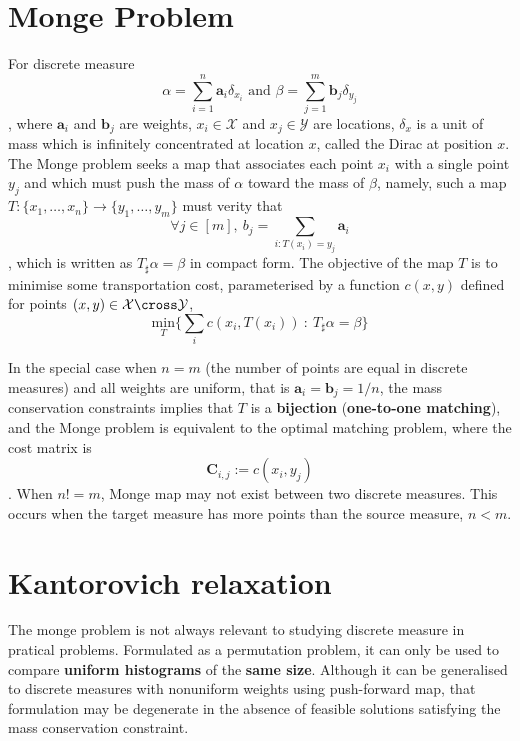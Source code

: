 \section{Monge Problem}
\begin{definition}\label{def}
  For discrete measure
  $$\alpha=\sum_{i=1}^n \mathbf{a}_i\delta_{x_i} \text{ and } \beta=\sum_{j=1}^m \mathbf{b}_j\delta_{y_j}$$,
  where $\mathbf{a}_i$ and $\mathbf{b}_j$ are weights, $x_i\in\mathcal{X}$ and $x_j\in\mathcal{Y}$ are locations, $\delta_x$ is a unit of mass which is infinitely concentrated at location $x$, called the Dirac at position $x$. The Monge problem seeks a map that associates each point $x_i$ with a single point $y_j$ and which must push the mass of $\alpha$ toward the mass of $\beta$, namely, such a map $T:\{x_1,\dots,x_n\}\rightarrow\{y_1,\dots,y_m\}$ must verity that 
  $$\forall j\in[m],\ b_j=\sum_{i:T(x_i)=y_j} \mathbf{a}_i$$,
  which is written as $T_\sharp\alpha=\beta$ in compact form. The objective of the map $T$ is to minimise some transportation cost, parameterised by a function $c(x,y)$ defined for points $(x,y)\in\mathcal{X}\cross\mathcal{Y}$, 
  $$\underset{T}{\text{min}}\Biggl\{\sum_i c(x_i,T(x_i))\ : \ T_\sharp\alpha=\beta\Biggr\}$$

  In the special case when $n=m$ (the number of points are equal in discrete measures) and all weights are uniform, that is $\mathbf{a}_i=\mathbf{b}_j=1/n$, the mass conservation constraints implies that $T$ is a \textbf{bijection} (\textbf{one-to-one matching}), and the Monge problem is equivalent to the optimal matching problem, where the cost matrix is 
  $$\mathbf{C}_{i,j}:=c(x_i,y_j)$$.
  When $n!=m$, Monge map may not exist between two discrete measures. This occurs when the target measure has more points than the source measure, $n<m$.
\end{definition}

\section{Kantorovich relaxation}
The monge problem is not always relevant to studying discrete measure in pratical problems. Formulated as a permutation problem, it can only be used to compare \textbf{uniform histograms} of the \textbf{same size}. Although it can be generalised to discrete measures with nonuniform weights using push-forward map, that formulation may be degenerate in the absence of feasible solutions satisfying the mass conservation constraint. 

